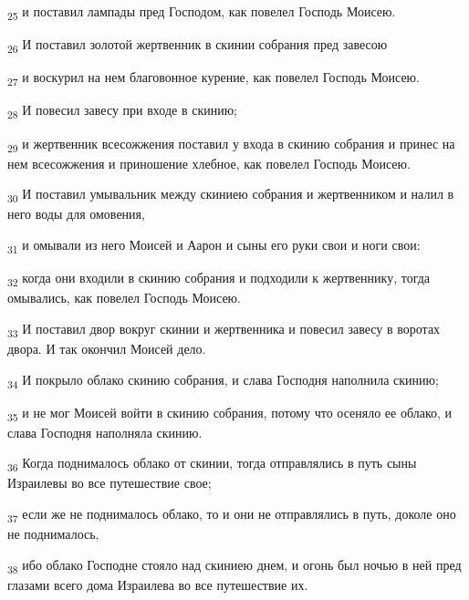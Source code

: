 \begin{tcolorbox}
\textsubscript{25} и поставил лампады пред Господом, как повелел Господь Моисею.
\end{tcolorbox}
\begin{tcolorbox}
\textsubscript{26} И поставил золотой жертвенник в скинии собрания пред завесою
\end{tcolorbox}
\begin{tcolorbox}
\textsubscript{27} и воскурил на нем благовонное курение, как повелел Господь Моисею.
\end{tcolorbox}
\begin{tcolorbox}
\textsubscript{28} И повесил завесу при входе в скинию;
\end{tcolorbox}
\begin{tcolorbox}
\textsubscript{29} и жертвенник всесожжения поставил у входа в скинию собрания и принес на нем всесожжения и приношение хлебное, как повелел Господь Моисею.
\end{tcolorbox}
\begin{tcolorbox}
\textsubscript{30} И поставил умывальник между скиниею собрания и жертвенником и налил в него воды для омовения,
\end{tcolorbox}
\begin{tcolorbox}
\textsubscript{31} и омывали из него Моисей и Аарон и сыны его руки свои и ноги свои:
\end{tcolorbox}
\begin{tcolorbox}
\textsubscript{32} когда они входили в скинию собрания и подходили к жертвеннику, тогда омывались, как повелел Господь Моисею.
\end{tcolorbox}
\begin{tcolorbox}
\textsubscript{33} И поставил двор вокруг скинии и жертвенника и повесил завесу в воротах двора. И так окончил Моисей дело.
\end{tcolorbox}
\begin{tcolorbox}
\textsubscript{34} И покрыло облако скинию собрания, и слава Господня наполнила скинию;
\end{tcolorbox}
\begin{tcolorbox}
\textsubscript{35} и не мог Моисей войти в скинию собрания, потому что осеняло ее облако, и слава Господня наполняла скинию.
\end{tcolorbox}
\begin{tcolorbox}
\textsubscript{36} Когда поднималось облако от скинии, тогда отправлялись в путь сыны Израилевы во все путешествие свое;
\end{tcolorbox}
\begin{tcolorbox}
\textsubscript{37} если же не поднималось облако, то и они не отправлялись в путь, доколе оно не поднималось,
\end{tcolorbox}
\begin{tcolorbox}
\textsubscript{38} ибо облако Господне стояло над скиниею днем, и огонь был ночью в ней пред глазами всего дома Израилева во все путешествие их.
\end{tcolorbox}

